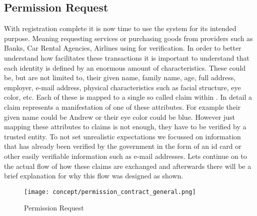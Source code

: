 \subsection{Permission Request}
With registration complete it is now time to use the system for its intended purpose. Meaning requesting services or purchasing goods from providers such as Banks, 
Car Rental Agencies, Airlines using \projectName{} for verification. In order to better understand how \projectName{} facilitates these transactions it is important to understand that
each identity is defined by an enormous amount of characteristics. These could be, but are not limited to, their given name, family name, age, full address, employer, e-mail address, physical characteristics such as facial structure, eye color, etc.
Each of these is mapped to a single so called claim within \projectName{}. In detail a claim represents a manifestation of one of these attributes. For example their given name could be Andrew or their eye color could be blue.
However just mapping these attributes to claims is not enough, they have to be verified by a trusted entity. To not set unrealistic expectations we focussed on information that has already been verified by the government in the form of an id card or other easily verifiable information such as
e-mail addresses. Lets continue on to the actual flow of how these claims are exchanged and afterwards there will be a brief explanation for why this flow was designed as shown. 

\begin{figure}[ht]
\centering
\texttt{[image: concept/permission\_contract\_general.png]}
\caption{Permission Request}
\label{fig:permission_request}
\end{figure}

